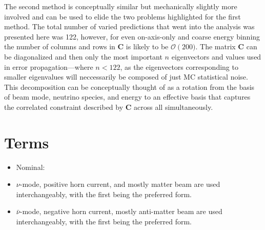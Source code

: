 \documentclass{article}
\begin{document}
The second method is conceptually similar but mechanically slightly more involved and can be used to elide the two problems highlighted for the first method. The total number of varied predictions that went into the analysis was presented here was 122, however, for even on-axis-only and coarse energy binning the number of columns and rows in $\mathbf{C}$ is likely to be $\mathcal{O}\left(200)$. The matrix $\mathbf{C}$ can be diagonalized and then only the most important $n$ eigenvectors and values used in error propagation---where $n<122$, as the eigenvectors corresponding to smaller eigenvalues will neccessarily be composed of just MC statistical noise. This decomposition can be conceptually thought of as a rotation from the basis of beam mode, neutrino species, and energy to an effective basis that captures the correlated constraint described by $\mathbf{C}$ across all simultaneously.


\section{Terms}

\begin{itemize}
\item Nominal:
\item $\nu$-mode, positive horn current, and mostly matter beam are used interchangeably, with the first being the preferred form.
\item $\bar{\nu}$-mode, negative horn current, mostly anti-matter beam are used interchangeably, with the first being the preferred form.
\end{itemize}
\end{document}
